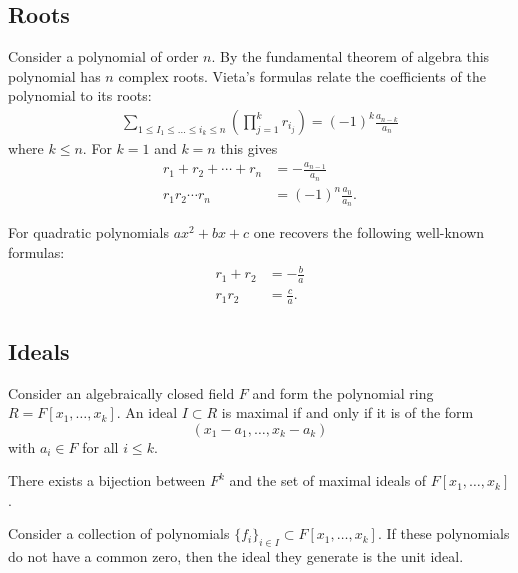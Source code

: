 \subsection{Roots}

	\begin{formula}[Vieta]
		Consider a polynomial of order $n$. By the fundamental theorem of algebra this polynomial has $n$ complex roots. Vieta's formulas relate the coefficients of the polynomial to its roots:
		\begin{gather}
			\sum_{1\leq I_1\leq\ldots\leq i_k\leq n}\left(\prod_{j=1}^kr_{i_j}\right) = (-1)^k\frac{a_{n-k}}{a_n}
		\end{gather}
		where $k\leq n$. For $k=1$ and $k=n$ this gives
		\begin{align}
			r_1+r_2+\cdots+r_n &= -\frac{a_{n-1}}{a_n}\\
			r_1r_2\cdots r_n &= (-1)^n\frac{a_0}{a_n}.
		\end{align}
	\end{formula}
	\begin{example}
		For quadratic polynomials $ax^2+bx+c$ one recovers the following well-known formulas:
		\begin{align}
			r_1+r_2 &= -\frac{b}{a}\\
			r_1r_2 &= \frac{c}{a}.
		\end{align}
	\end{example}

\subsection{Ideals}

	\begin{theorem}
		Consider an algebraically closed field $F$ and form the polynomial ring $R=F[x_1, \ldots, x_k]$. An ideal $I\subset R$ is maximal if and only if it is of the form \[(x_1-a_1, \ldots, x_k-a_k)\] with $a_i\in F$ for all $i\leq k$.
	\end{theorem}
	\begin{result}
		There exists a bijection between $F^k$ and the set of maximal ideals of $F[x_1, \ldots, x_k]$.
	\end{result}
	\begin{result}
		Consider a collection of polynomials $\{f_i\}_{i\in I}\subset F[x_1, \ldots, x_k]$. If these polynomials do not have a common zero, then the ideal they generate is the unit ideal.
	\end{result}

